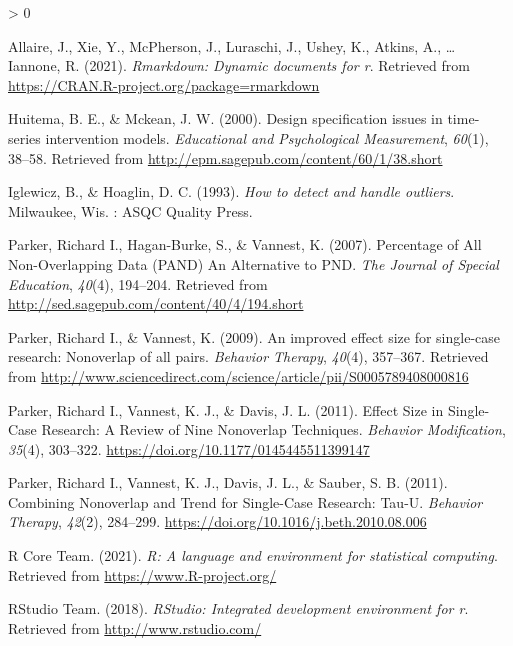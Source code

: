 \documentclass[
]{book}
\newlength{\cslhangindent}
\newenvironment{CSLReferences}[2] %
 {%
  \setlength{\parindent}{0pt}
  \ifodd #1 \everypar{\setlength{\hangindent}{\cslhangindent}}\ignorespaces\fi
  \ifnum #2 > 0
  \setlength{\parskip}{#2\baselineskip}
  \fi
 }%
 {}
\begin{document}
\hypertarget{refs}{}
\begin{CSLReferences}{1}{0}
\leavevmode\hypertarget{ref-R-rmarkdown}{}%
Allaire, J., Xie, Y., McPherson, J., Luraschi, J., Ushey, K., Atkins, A., \ldots{} Iannone, R. (2021). \emph{Rmarkdown: Dynamic documents for r}. Retrieved from \url{https://CRAN.R-project.org/package=rmarkdown}

\leavevmode\hypertarget{ref-huitema_design_2000}{}%
Huitema, B. E., \& Mckean, J. W. (2000). Design specification issues in time-series intervention models. \emph{Educational and Psychological Measurement}, \emph{60}(1), 38--58. Retrieved from \url{http://epm.sagepub.com/content/60/1/38.short}

\leavevmode\hypertarget{ref-iglewicz_how_1993}{}%
Iglewicz, B., \& Hoaglin, D. C. (1993). \emph{How to detect and handle outliers}. Milwaukee, Wis. : ASQC Quality Press.

\leavevmode\hypertarget{ref-parker_percentage_2007}{}%
Parker, Richard I., Hagan-Burke, S., \& Vannest, K. (2007). Percentage of {All} {Non}-{Overlapping} {Data} ({PAND}) {An} {Alternative} to {PND}. \emph{The Journal of Special Education}, \emph{40}(4), 194--204. Retrieved from \url{http://sed.sagepub.com/content/40/4/194.short}

\leavevmode\hypertarget{ref-parker_improved_2009}{}%
Parker, Richard I., \& Vannest, K. (2009). An improved effect size for single-case research: {Nonoverlap} of all pairs. \emph{Behavior Therapy}, \emph{40}(4), 357--367. Retrieved from \url{http://www.sciencedirect.com/science/article/pii/S0005789408000816}

\leavevmode\hypertarget{ref-parker_effect_2011}{}%
Parker, Richard I., Vannest, K. J., \& Davis, J. L. (2011). Effect {Size} in {Single}-{Case} {Research}: {A} {Review} of {Nine} {Nonoverlap} {Techniques}. \emph{Behavior Modification}, \emph{35}(4), 303--322. \url{https://doi.org/10.1177/0145445511399147}

\leavevmode\hypertarget{ref-parker_combining_2011}{}%
Parker, Richard I., Vannest, K. J., Davis, J. L., \& Sauber, S. B. (2011). Combining {Nonoverlap} and {Trend} for {Single}-{Case} {Research}: {Tau}-{U}. \emph{Behavior Therapy}, \emph{42}(2), 284--299. \url{https://doi.org/10.1016/j.beth.2010.08.006}

\leavevmode\hypertarget{ref-R-base}{}%
R Core Team. (2021). \emph{R: A language and environment for statistical computing}. Retrieved from \url{https://www.R-project.org/}

\leavevmode\hypertarget{ref-RStudio}{}%
RStudio Team. (2018). \emph{RStudio: Integrated development environment for r}. Retrieved from \url{http://www.rstudio.com/}


\end{CSLReferences}
\end{document}
